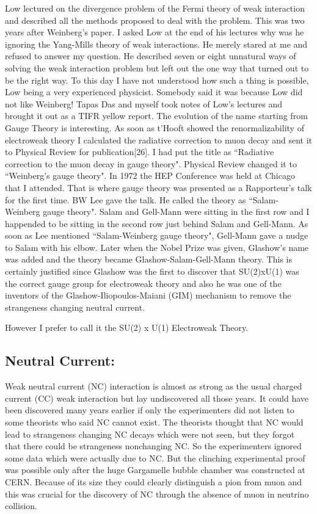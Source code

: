 Low lectured on the divergence problem of the Fermi theory of weak 
interaction and described all the methods proposed to deal with the 
problem. This was two years after Weinberg's paper. I asked Low at the 
end of his lectures why was he ignoring the Yang-Mills theory of weak 
interactions. He merely stared at me and refused to answer my question. 
He described seven or eight unnatural ways of solving the weak 
interaction pro\-blem but left out the one way that turned out to be the 
right way. To this day I have not understood how such a thing is 
possible, Low being a very experienced physicist. Somebody said it was 
because Low did not like Weinberg! Tapas Das and myself took notes of 
Low's lectures and brought it out as a TIFR yellow report.
\vskip 1pt
The evolution of the name starting from Gauge Theory is inte\-resting. As 
soon as t'Hooft showed the renormalizability of electroweak theory I 
calculated the radiative correction to muon decay and sent it to 
Physical Review for publication[26]. I had put the title as ``Radiative 
correction to the muon decay in gauge theory". Physical Review changed 
it to ``Weinberg's gauge theory". In 1972 the HEP Conference was held at 
Chicago that I atten\-ded. That is where gauge theory was presented as a 
Rappor\-teur's talk for the first time. BW Lee gave the talk. He called 
the theory as ``Salam-Weinberg gauge theory". Salam and Gell-Mann were 
sitting in the first row and I happended to be sitting in the second row 
just behind Salam and Gell-Mann. As soon as Lee mentioned 
``Salam-Weinberg gauge theory", Gell-Mann gave a nudge to Salam with his 
elbow. Later when the Nobel Prize was given, Glashow's name was added 
and the theory became Glashow-Salam-Gell-Mann theory. This is certainly 
justi\-fied since Glashow was the first to discover that SU(2)xU(1) was 
the correct gauge group for electroweak theory and also he was one of 
the inventors of the Glashow-Iliopoulos-Maiani (GIM) mechanism to remove 
the strangeness changing neutral current.

However I prefer to call it the SU(2) x U(1) Electroweak Theory.

\subsection*{Neutral Current:}

Weak neutral current (NC) interaction is almost as strong as the usual 
charged current (CC) weak interaction but lay undisco\-vered all those 
years. It could have been discovered many years earlier if only the 
experimenters did not listen to some theorists who said NC cannot exist. 
The theorists thought that NC would lead to strangeness changing NC 
decays which were not seen, but they for\-got that there could be 
strangeness nonchanging NC. So the experi\-menters ignored some data which 
were actually due to NC. But the clinching experimental proof was 
possible only after the huge Gargamelle bubble chamber was constructed 
at CERN. Becau\-se of its size they could clearly distinguish a pion from 
muon and this was crucial for the discovery of NC through the absence of 
muon in neutrino collision.


